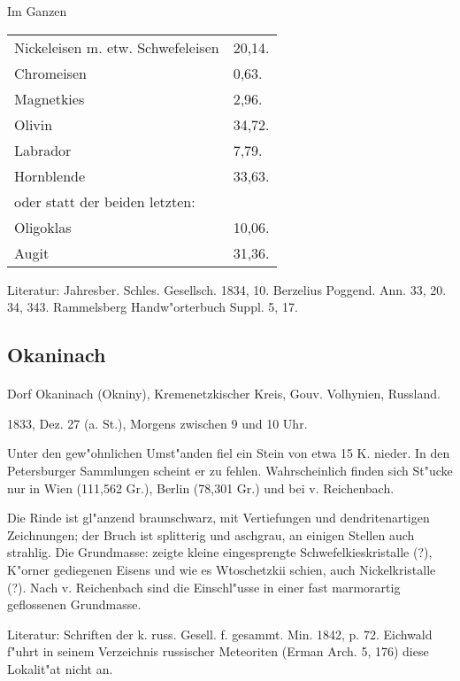 \documentclass[a4paper, 11pt, oneside]{article}
\begin{document}
\begin{center}
Im Ganzen
\end{center}
\begin{table}[H]
    \centering
    \begin{tabular}{l l}
        Nickeleisen m. etw. Schwefeleisen & 20,14. \\
        Chromeisen & 0,63. \\
        Magnetkies & 2,96. \\
        Olivin & 34,72. \\
        Labrador & 7,79. \\
        Hornblende & 33,63. \\
        oder statt der beiden letzten:  &  \\
        Oligoklas & 10,06. \\
        Augit & 31,36. \\
    \end{tabular}
\end{table}

\footnotesize
Literatur: Jahresber. Schles. Gesellsch. 1834, 10. Berzelius Poggend. Ann. 33, 20. 34, 343. Rammelsberg Handw"orterbuch Suppl. 5, 17.

\subsection{Okaninach}
\normalsize
\paragraph{}
Dorf Okaninach (Okniny), Kremenetzkischer Kreis, Gouv. Volhynien, Russland.

1833, Dez. 27 (a. St.), Morgens zwischen 9 und 10 Uhr.

Unter den gew"ohnlichen Umst"anden fiel ein Stein von etwa 15 K. nieder. In den Petersburger Sammlungen scheint er zu fehlen. Wahrscheinlich finden sich St"ucke nur in Wien (111,562 Gr.), Berlin (78,301 Gr.) und bei v. Reichenbach.

Die Rinde ist gl"anzend braunschwarz, mit Vertiefungen und dendritenartigen Zeichnungen; der Bruch ist splitterig und aschgrau, an einigen Stellen auch strahlig. Die Grundmasse: zeigte kleine eingesprengte Schwefelkieskristalle (?), K"orner gediegenen Eisens und wie es Wtoschetzkii schien, auch Nickelkristalle (?). Nach v. Reichenbach sind die Einschl"usse in einer fast marmorartig geflossenen Grundmasse.

\footnotesize
Literatur: Schriften der k. russ. Gesell. f. gesammt. Min. 1842, p. 72. Eichwald f"uhrt in seinem Verzeichnis russischer Meteoriten (Erman Arch. 5, 176) diese Lokalit"at nicht an.
\end{document}
